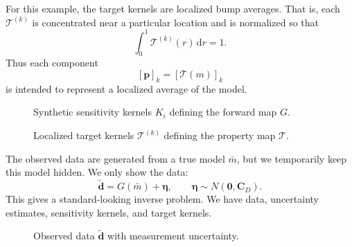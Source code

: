 \documentclass[11pt,openany]{book}
\theoremstyle{definition}
\theoremstyle{remark}
\newcommand{\Tau}{\mathcal{T}}
\newcommand{\dd}{\,\mathrm d}
\begin{document}
For this example, the target kernels are localized bump averages. That is, each
\(\mathcal T^{(k)}\) is concentrated near a particular location and is normalized so that
\[
  \int_0^1 \mathcal T^{(k)}(r)\dd r=1.
\]
Thus each component
\[
  [\mathbf p]_k=[\Tau(m)]_k
\]
is intended to represent a localized average of the model.

\begin{figure}[ht]
  \centering
  \caption{Synthetic sensitivity kernels \(K_i\) defining the forward map \(G\).}
  \label{fig:act7-sensitivity-kernels}
\end{figure}

\begin{figure}[ht]
  \centering
  \caption{Localized target kernels \(\mathcal T^{(k)}\) defining the property map \(\Tau\).}
  \label{fig:act7-target-kernels}
\end{figure}

The observed data are generated from a true model \(\bar m\), but we temporarily keep this model
hidden. We only show the data:
\[
  \widetilde{\mathbf d}
  =
  G(\bar m)+\boldsymbol\eta,
  \qquad
  \boldsymbol\eta\sim N(\mathbf 0,\mathbf C_D).
\]
This gives a standard-looking inverse problem. We have data, uncertainty estimates, sensitivity
kernels, and target kernels.

\begin{figure}[ht]
  \centering
  \caption{Observed data \(\widetilde{\mathbf d}\) with measurement uncertainty.}
  \label{fig:act7-observed-data}
\end{figure}
\end{document}

